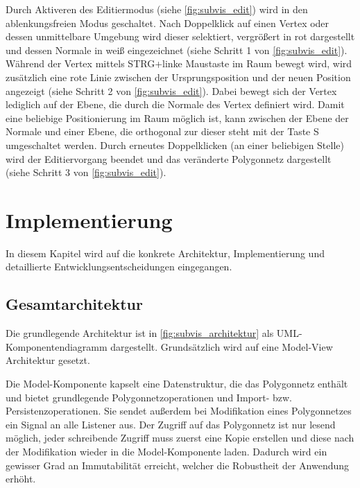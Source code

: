 Durch Aktiveren des Editiermodus (siehe \autoref{fig:subvis_edit}) wird in den ablenkungsfreien Modus geschaltet.
Nach Doppelklick auf einen Vertex oder dessen unmittelbare Umgebung wird dieser selektiert, vergrößert in rot dargestellt und dessen Normale in weiß eingezeichnet (siehe Schritt 1 von \autoref{fig:subvis_edit}).
Während der Vertex mittels STRG+linke Maustaste im Raum bewegt wird, wird zusätzlich eine rote Linie zwischen der Ursprungsposition und der neuen Position angezeigt (siehe Schritt 2 von \autoref{fig:subvis_edit}).
Dabei bewegt sich der Vertex lediglich auf der Ebene, die durch die Normale des Vertex definiert wird.
Damit eine beliebige Positionierung im Raum möglich ist, kann zwischen der Ebene der Normale und einer Ebene, die orthogonal zur dieser steht mit der Taste S umgeschaltet werden.
Durch erneutes Doppelklicken (an einer beliebigen Stelle) wird der Editiervorgang beendet und das veränderte Polygonnetz dargestellt (siehe Schritt 3 von \autoref{fig:subvis_edit}).


\section{Implementierung}

In diesem Kapitel wird auf die konkrete Architektur, Implementierung und detaillierte Entwicklungsentscheidungen eingegangen.

\subsection{Gesamtarchitektur}

Die grundlegende Architektur ist in \autoref{fig:subvis_architektur} als UML-Komponentendiagramm dargestellt. 
Grundsätzlich wird auf eine Model-View Architektur gesetzt.

Die Model-Komponente kapselt eine Datenstruktur, die das Polygonnetz enthält und bietet grundlegende Polygonnetzoperationen und Import- bzw. Persistenzoperationen.
Sie sendet außerdem bei Modifikation eines Polygonnetzes ein Signal an alle Listener aus.
Der Zugriff auf das Polygonnetz ist nur lesend möglich, jeder schreibende Zugriff muss zuerst eine Kopie erstellen und diese nach der Modifikation wieder in die Model-Komponente laden.
Dadurch wird ein gewisser Grad an Immutabilität erreicht, welcher die Robustheit der Anwendung erhöht.

